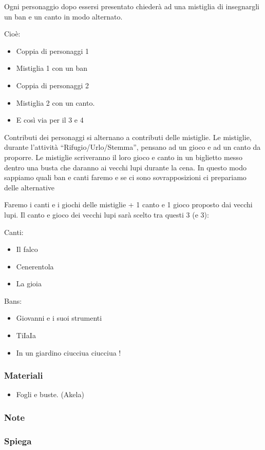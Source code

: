 \documentclass[../main.tex]{subfiles}
\begin{document}
        Ogni personaggio dopo essersi presentato chiederà ad una mistiglia di insegnargli un ban e un canto in modo alternato.

        Cioè:
        \begin{itemize}
            \item Coppia di personaggi 1
            \item Mistiglia 1 con un ban
            \item Coppia di personaggi  2
            \item Mistiglia 2 con un canto.
            \item E così via per il 3 e 4
        \end{itemize}

        Contributi dei personaggi si alternano a contributi delle mistiglie.
        Le mistiglie, durante l'attività “Rifugio/Urlo/Stemma”, pensano ad un gioco e ad un canto da proporre. Le mistiglie scriveranno il loro gioco e canto in un biglietto messo dentro una busta che daranno ai vecchi lupi durante la cena. In questo modo sappiamo quali ban e canti faremo e se ci sono sovrapposizioni ci prepariamo delle alternative

        Faremo i canti e i giochi delle mistiglie + 1 canto e 1 gioco proposto dai vecchi lupi.
        Il canto e gioco dei vecchi lupi sarà scelto tra questi 3 (e 3):
        
        Canti:
        \begin{itemize}
            \item Il falco
            \item Cenerentola
            \item La gioia
        \end{itemize}

        Bans:
        \begin{itemize}
            \item Giovanni e i suoi strumenti
            \item TiIaIa
            \item In un giardino ciucciua ciucciua ! 
        \end{itemize}

        \subsubsection{Materiali}
        \begin{itemize}
            \item Fogli e buste. (Akela)
        \end{itemize}
        \subsubsection{Note}
        \subsubsection{Spiega}
   
\end{document}
